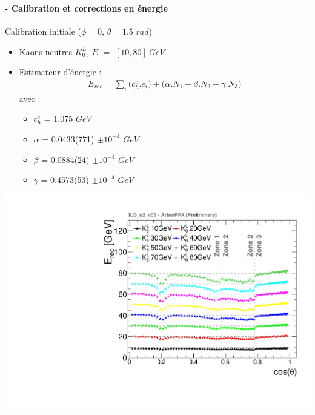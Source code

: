 \documentclass[8pt]{beamer}
\begin{document}
  \begin{frame}
  \frametitle{\secname}
  \framesubtitle{\subsecname - Calibration et corrections en énergie}
    \begin{minipage}{0.6\linewidth}
      \begin{block}{Calibration initiale ($\phi=0$, $\theta=1.5$ $rad$)}
        \begin{itemize}
          \item Kaons neutres $K_{0}^{L}$, $E$ $=$ $[10, 80]~GeV$
          \item Estimateur d'énergie :
          \begin{align*}
            E_{rec} = \sum_{i} \big(c_{h}^{e}.e_i\big) + \big(\alpha.N_1 + \beta.N_2 + \gamma.N_3\big)
          \end{align*}
          avec :
          \begin{itemize}
            \item $c_{h}^{e}$ = 1.075 $GeV$
            \item $\alpha$ = 0.0433(771) $\pm 10^{-4}$ $GeV$
            \item $\beta$  = 0.0884(24)  $\pm 10^{-4}$ $GeV$
            \item $\gamma$ = 0.4573(53)  $\pm 10^{-4}$ $GeV$
          \end{itemize}
        \end{itemize}
      \end{block}
      \begin{center}
        \includegraphics[width=0.6\linewidth]{ERecLin.pdf}
      \end{center}
    \end{minipage} \hfill
    \begin{minipage}{0.39\linewidth}
      \begin{center}

\end{center}
\end{minipage}
\end{frame}
\end{document}
